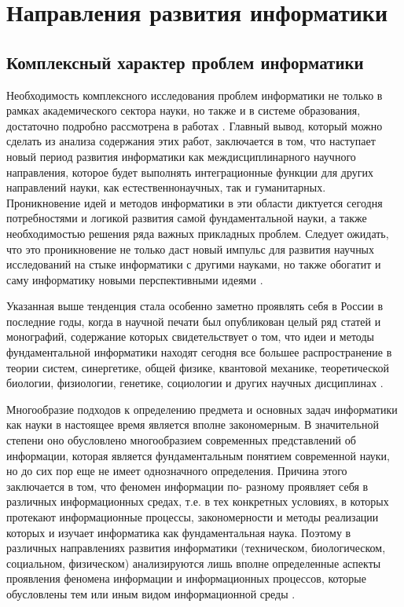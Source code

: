 \chapter{Направления развития информатики} \label{chapt2}

\section{Комплексный характер проблем информатики} \label{sect2_1}

Необходимость комплексного исследования проблем информатики не только в рамках академического сектора науки, но также и в системе образования, достаточно подробно рассмотрена в работах \cite{bib302,bib210,bib211,bib303}. Главный вывод, который можно сделать из анализа содержания этих работ, заключается в том, что наступает новый период развития информатики как междисциплинарного научного направления, которое будет выполнять интеграционные функции для других направлений науки, как естественнонаучных, так и гуманитарных. Проникновение идей и методов информатики в эти области диктуется сегодня потребностями и логикой развития самой фундаментальной науки, а также необходимостью решения ряда важных прикладных проблем. Следует ожидать, что это проникновение не только даст новый импульс для развития научных исследований на стыке информатики с другими науками, но также обогатит и саму информатику новыми перспективными идеями \cite{bib105}.

Указанная выше тенденция стала особенно заметно проявлять себя в России в последние годы, когда в научной печати был опубликован целый ряд статей и монографий, содержание которых свидетельствует о том, что идеи и методы фундаментальной информатики находят сегодня все большее распространение в теории систем, синергетике, общей физике, квантовой механике, теоретической биологии, физиологии, генетике, социологии и других научных дисциплинах \cite{bib105}.

Многообразие подходов к определению предмета и основных задач информатики как науки в настоящее время является вполне закономерным. В значительной степени оно обусловлено многообразием современных представлений об информации, которая является фундаментальным понятием современной науки, но до сих пор еще не имеет однозначного определения. Причина этого заключается в том, что феномен информации по- разному проявляет себя в различных информационных средах, т.е. в тех конкретных условиях, в которых протекают информационные процессы, закономерности и методы реализации которых и изучает информатика как фундаментальная наука. Поэтому в различных направлениях развития информатики (техническом, биологическом, социальном, физическом) анализируются лишь вполне определенные аспекты проявления феномена информации и информационных процессов, которые обусловлены тем или иным видом информационной среды \cite{bib201,bib212}.

